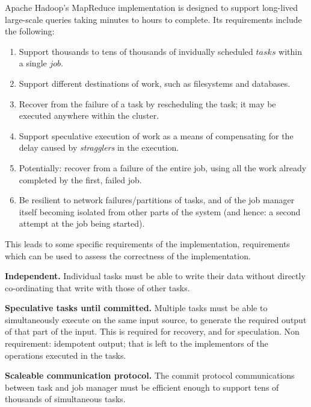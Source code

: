 \documentclass[9pt,technote]{IEEEtran}
\begin{document}
Apache Hadoop's MapReduce implementation is designed to support long-lived
large-scale queries taking minutes to hours to complete.
Its requirements include the following:

\begin{enumerate}

\item Support thousands to tens of thousands of invidually scheduled $tasks$
within a single $job$.

\item Support different destinations of work, such as filesystems and databases.

\item Recover from the failure of a task by rescheduling the task;
it may be executed anywhere within the cluster.

\item Support speculative execution of work as a means of compensating for the
delay caused by \emph{stragglers} in the execution.

\item Potentially: recover from a failure of the entire job, using all the work
already completed by the first, failed job.

\item Be resilient to network failures/partitions of tasks, and of the job manager
itself becoming isolated from other parts of the system (and hence: a second
attempt at the job being started).

\end{enumerate}



This leads to some specific requirements of the implementation, requirements
which can be used to assess the correctness of the implementation.

\textbf{Independent.}
Individual tasks must be able to write their data without directly
co-ordinating that write with those of other tasks.

\textbf{Speculative tasks until committed.}
Multiple tasks must be able to simultaneously execute on the same input
source, to generate the required output of that part of the input.
This is required for recovery, and for speculation.
Non requirement: idempotent output;
that is left to the implementors of the operations executed in the tasks.

\textbf{Scaleable communication protocol.}
The commit protocol communications between task and job manager
must be efficient enough to support tens of thousands of simultaneous
tasks.
\end{document}
